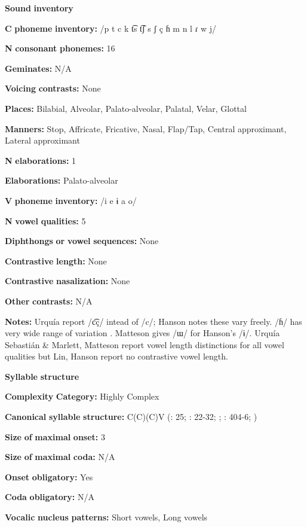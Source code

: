 \begin{styleBody}
\textbf{Sound} \textbf{inventory}

\textbf{C} \textbf{phoneme} \textbf{inventory:} /p t c k t͡s t͡ʃ s ʃ ç ɦ m n l ɾ w j/

\textbf{N} \textbf{consonant} \textbf{phonemes:} 16

\textbf{Geminates:} N/A

\textbf{Voicing} \textbf{contrasts:} None

\textbf{Places:} Bilabial, Alveolar, Palato-alveolar, Palatal, Velar, Glottal

\textbf{Manners:} Stop, Affricate, Fricative, Nasal, Flap/Tap, Central approximant, Lateral approximant

\textbf{N} \textbf{elaborations:} 1

\textbf{Elaborations:} Palato-alveolar

\textbf{V} \textbf{phoneme} \textbf{inventory:} /i e ɨ a o/

\textbf{N} \textbf{vowel} \textbf{qualities:} 5

\textbf{Diphthongs} \textbf{or} \textbf{vowel} \textbf{sequences:} None

\textbf{Contrastive} \textbf{length:} None

\textbf{Contrastive} \textbf{nasalization:} None

\textbf{Other} \textbf{contrasts:} N/A

\textbf{Notes:} Urquía \citet{SebastiánMarlett2008} report /c͡ç/ intead of /c/; Hanson notes these vary freely. /ɦ/ has very wide range of variation \citep[20-23]{Hanson2010}. Matteson gives /ɯ/ for Hanson’s /ɨ/. Urquía Sebastián \& Marlett, Matteson report vowel length distinctions for all vowel qualities but Lin, Hanson report no contrastive vowel length.

\textbf{Syllable} \textbf{structure}

\textbf{Complexity} \textbf{Category:} Highly Complex

\textbf{Canonical} \textbf{syllable} \textbf{structure:} C(C)(C)V (\citealt{Hanson2010}: 25; \citealt{Matteson1965}: 22-32; \citealt{MattesonPike1958}; \citealt{Lin1997}: 404-6; \citealt{Lin1993})

\textbf{Size} \textbf{of} \textbf{maximal} \textbf{onset:} 3

\textbf{Size} \textbf{of} \textbf{maximal} \textbf{coda:} N/A

\textbf{Onset} \textbf{obligatory:} Yes

\textbf{Coda} \textbf{obligatory:} N/A

\textbf{Vocalic} \textbf{nucleus} \textbf{patterns:} Short vowels, Long vowels


\end{styleBody}

